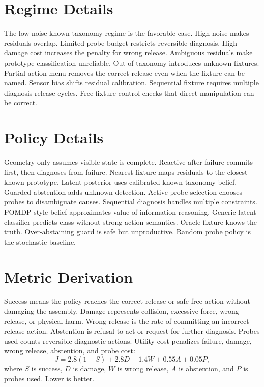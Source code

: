 \documentclass{article}
\begin{document}
\section{Regime Details}

The low-noise known-taxonomy regime is the favorable case. High noise makes
residuals overlap. Limited probe budget restricts reversible diagnosis. High
damage cost increases the penalty for wrong release. Ambiguous residuals make
prototype classification unreliable. Out-of-taxonomy introduces unknown
fixtures. Partial action menu removes the correct release even when the
fixture can be named. Sensor bias shifts residual calibration. Sequential
fixture requires multiple diagnosis-release cycles. Free fixture control checks
that direct manipulation can be correct.

\section{Policy Details}

Geometry-only assumes visible state is complete. Reactive-after-failure commits
first, then diagnoses from failure. Nearest fixture maps residuals to the
closest known prototype. Latent posterior uses calibrated known-taxonomy
belief. Guarded abstention adds unknown detection. Active probe selection
chooses probes to disambiguate causes. Sequential diagnosis handles multiple
constraints. POMDP-style belief approximates value-of-information reasoning.
Generic latent classifier predicts class without strong action semantics.
Oracle fixture knows the truth. Over-abstaining guard is safe but unproductive.
Random probe policy is the stochastic baseline.

\section{Metric Derivation}

Success means the policy reaches the correct release or safe free action
without damaging the assembly. Damage represents collision, excessive force,
wrong release, or physical harm. Wrong release is the rate of committing an
incorrect release action. Abstention is refusal to act or request for further
diagnosis. Probes used counts reversible diagnostic actions. Utility cost
penalizes failure, damage, wrong release, abstention, and probe cost:
\[
J =
2.8(1-S) + 2.8D + 1.4W + 0.55A + 0.05P,
\]
where $S$ is success, $D$ is damage, $W$ is wrong release, $A$ is abstention,
and $P$ is probes used. Lower is better.
\end{document}
